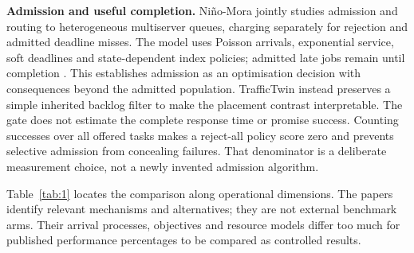 \documentclass[11pt,a4paper]{article}
\begin{document}
\textbf{Admission and useful completion.} Niño-Mora jointly studies admission and routing to heterogeneous multiserver queues, charging separately for rejection and admitted deadline misses. The model uses Poisson arrivals, exponential service, soft deadlines and state-dependent index policies; admitted late jobs remain until completion \cite{ref11}. This establishes admission as an optimisation decision with consequences beyond the admitted population. TrafficTwin instead preserves a simple inherited backlog filter to make the placement contrast interpretable. The gate does not estimate the complete response time or promise success. Counting successes over all offered tasks makes a reject-all policy score zero and prevents selective admission from concealing failures. That denominator is a deliberate measurement choice, not a newly invented admission algorithm.

Table~\ref{tab:1} locates the comparison along operational dimensions. The papers identify relevant mechanisms and alternatives; they are not external benchmark arms. Their arrival processes, objectives and resource models differ too much for published performance percentages to be compared as controlled results.
\end{document}
